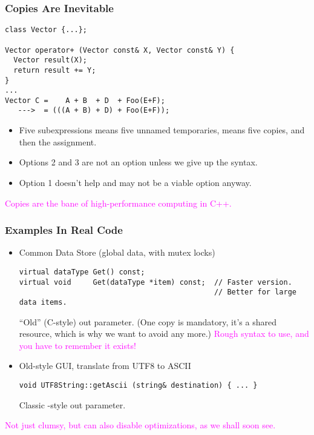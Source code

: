 
\begin{frame}[fragile,t]
\frametitle{Copies Are Inevitable}
{\scriptsize
\begin{verbatim}
class Vector {...};

Vector operator+ (Vector const& X, Vector const& Y) {
  Vector result(X);
  return result += Y;
}
...
Vector C =    A + B  + D  + Foo(E+F);
   --->  = (((A + B) + D) + Foo(E+F));
\end{verbatim}
}

\begin{itemize}[<+->]
\item Five subexpressions means five unnamed temporaries, means five
  copies, and then the assignment.
\item Options 2 and 3 are not an option unless we give up the syntax.
\item Option 1 doesn't help and may not be a viable option anyway.
\end{itemize}

\pause

{ \hfill \textcolor{magenta} {Copies are the bane of
    high-performance computing in C++.} \hfill}


\end{frame}

\begin{frame}[fragile,t]
\frametitle{Examples In Real Code}

\begin{itemize}[<+->]

\item Common Data Store (global data, with mutex locks)
{\scriptsize
\begin{verbatim}
virtual dataType Get() const;
virtual void     Get(dataType *item) const;  // Faster version.
                                             // Better for large data items.
\end{verbatim}
}
``Old'' (C-style) out parameter.  (One copy is mandatory, it's a shared
resource, which is why we want to avoid any more.)
\textcolor{magenta}{Rough syntax to use, and you have to remember it exists!}

\vskip 12pt

\item Old-style GUI, translate from UTF8 to ASCII
{\scriptsize
\begin{verbatim}
void UTF8String::getAscii (string& destination) { ... }
\end{verbatim}
}
Classic \CC-style out parameter.

\vskip 12pt

\end{itemize}
\pause

{ \textcolor{magenta} {Not just clumsy, but can also disable
optimizations, as we shall soon see.}}


\end{frame}

